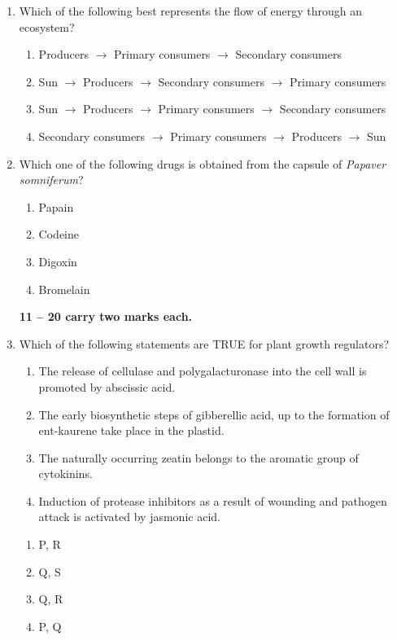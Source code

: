 \documentclass[journal,12pt,onecolumn]{IEEEtran}
\begin{document}
\begin{enumerate}[label=\arabic*.]
\item Which of the following best represents the flow of energy through an ecosystem?

\begin{enumerate}[label=(\Alph*)]
\item Producers $\rightarrow$ Primary consumers $\rightarrow$ Secondary consumers
\item Sun $\rightarrow$ Producers $\rightarrow$ Secondary consumers $\rightarrow$ Primary consumers
\item Sun $\rightarrow$ Producers $\rightarrow$ Primary consumers $\rightarrow$ Secondary consumers
\item Secondary consumers $\rightarrow$ Primary consumers $\rightarrow$ Producers $\rightarrow$ Sun
\end{enumerate}
\item Which one of the following drugs is obtained from the capsule of \textit{Papaver somniferum}?
\begin{multicols}{4}
\begin{enumerate}[label=(\Alph*)]
\item Papain
\item Codeine
\item Digoxin
\item Bromelain
\end{enumerate}
\end{multicols}
\noindent \textbf{ 11 --  20 carry two marks each.}
\item Which of the following statements are TRUE for plant growth regulators?
\begin{enumerate}[label=\Alph*. ,start=16]
\item The release of cellulase and polygalacturonase into the cell wall is promoted by abscissic acid.
\item The early biosynthetic steps of gibberellic acid, up to the formation of ent-kaurene take place in the plastid.
\item The naturally occurring zeatin belongs to the aromatic group of cytokinins.
\item Induction of protease inhibitors as a result of wounding and pathogen attack is activated by jasmonic acid.
\end{enumerate}
\begin{multicols}{4}
\begin{enumerate}[label=(\Alph*)]
\item P, R
\item Q, S
\item Q, R
\item P, Q
\end{enumerate}
\end{multicols}


\end{enumerate}
\end{document}

